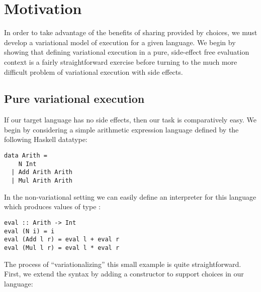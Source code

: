 \documentclass[12pt,oneside]{book}
\begin{document}
\begin{center}
\end{center}




\chapter{Motivation}
\label{ch:mot}

In order to take advantage of the benefits of sharing provided by choices, we must develop a variational
model of execution for a given language. We begin by showing that defining variational execution in a pure,
side-effect free evaluation context is a fairly straightforward exercise before turning to the much more
difficult problem of variational execution with side effects.

\section{Pure variational execution}
\label{sec:purevar}

If our target language has no side effects, then
our task is comparatively easy. We begin by considering a simple arithmetic expression language
defined by the following Haskell datatype:

\begin{lstlisting}
data Arith =
    N Int
  | Add Arith Arith
  | Mul Arith Arith
\end{lstlisting}

In the non-variational setting we can easily define an interpreter for this language which produces
values of type :

\begin{lstlisting}
eval :: Arith -> Int
eval (N i) = i
eval (Add l r) = eval l + eval r
eval (Mul l r) = eval l * eval r
\end{lstlisting}

The process of ``variationalizing'' this small example is quite straightforward. First, we extend the syntax by adding a
constructor to support choices in our language:
\end{document}
